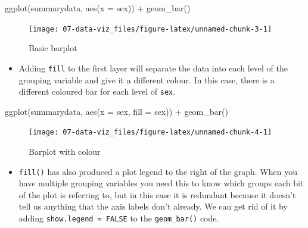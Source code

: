 \documentclass[
  oneside]{book}
\newenvironment{Shaded}{\begin{snugshade}}{\end{snugshade}}
\newcommand{\AttributeTok}[1]{\textcolor[rgb]{0.77,0.63,0.00}{#1}}
\newcommand{\FunctionTok}[1]{\textcolor[rgb]{0.00,0.00,0.00}{#1}}
\newcommand{\NormalTok}[1]{#1}
\newcommand{\SpecialCharTok}[1]{\textcolor[rgb]{0.00,0.00,0.00}{#1}}
\providecommand{\tightlist}{%
  \setlength{\itemsep}{0pt}\setlength{\parskip}{0pt}}
\begin{document}
\begin{Shaded}
\begin{Highlighting}[]
\FunctionTok{ggplot}\NormalTok{(summarydata, }\FunctionTok{aes}\NormalTok{(}\AttributeTok{x =}\NormalTok{ sex)) }\SpecialCharTok{+}
  \FunctionTok{geom\_bar}\NormalTok{()}
\end{Highlighting}
\end{Shaded}

\begin{figure}

{\centering \texttt{[image: 07-data-viz\_files/figure-latex/unnamed-chunk-3-1]} 

}

\caption{Basic barplot}\label{fig:unnamed-chunk-3}
\end{figure}

\begin{itemize}
\tightlist
\item
  Adding \texttt{fill} to the first layer will separate the data into each level of the grouping variable and give it a different colour. In this case, there is a different coloured bar for each level of \texttt{sex}.
\end{itemize}

\begin{Shaded}
\begin{Highlighting}[]
\FunctionTok{ggplot}\NormalTok{(summarydata, }\FunctionTok{aes}\NormalTok{(}\AttributeTok{x =}\NormalTok{ sex, }\AttributeTok{fill =}\NormalTok{ sex)) }\SpecialCharTok{+}
  \FunctionTok{geom\_bar}\NormalTok{()}
\end{Highlighting}
\end{Shaded}

\begin{figure}

{\centering \texttt{[image: 07-data-viz\_files/figure-latex/unnamed-chunk-4-1]} 

}

\caption{Barplot with colour}\label{fig:unnamed-chunk-4}
\end{figure}

\begin{itemize}
\tightlist
\item
  \texttt{fill()} has also produced a plot legend to the right of the graph. When you have multiple grouping variables you need this to know which groups each bit of the plot is referring to, but in this case it is redundant because it doesn't tell us anything that the axis labels don't already. We can get rid of it by adding \texttt{show.legend\ =\ FALSE} to the \texttt{geom\_bar()} code.
\end{itemize}
\end{document}
